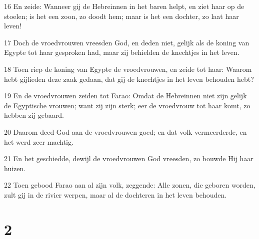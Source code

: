 \par 16 En zeide: Wanneer gij de Hebreinnen in het baren helpt, en ziet haar op de stoelen; is het een zoon, zo doodt hem; maar is het een dochter, zo laat haar leven!
\par 17 Doch de vroedvrouwen vreesden God, en deden niet, gelijk als de koning van Egypte tot haar gesproken had, maar zij behielden de knechtjes in het leven.
\par 18 Toen riep de koning van Egypte de vroedvrouwen, en zeide tot haar: Waarom hebt gijlieden deze zaak gedaan, dat gij de knechtjes in het leven behouden hebt?
\par 19 En de vroedvrouwen zeiden tot Farao: Omdat de Hebreinnen niet zijn gelijk de Egyptische vrouwen; want zij zijn sterk; eer de vroedvrouw tot haar komt, zo hebben zij gebaard.
\par 20 Daarom deed God aan de vroedvrouwen goed; en dat volk vermeerderde, en het werd zeer machtig.
\par 21 En het geschiedde, dewijl de vroedvrouwen God vreesden, zo bouwde Hij haar huizen.
\par 22 Toen gebood Farao aan al zijn volk, zeggende: Alle zonen, die geboren worden, zult gij in de rivier werpen, maar al de dochteren in het leven behouden.

\chapter{2}


